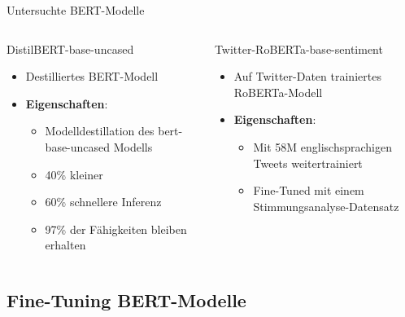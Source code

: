 \documentclass[aspectratio=169]{beamer} %
\begin{document}
\begin{frame}{Untersuchte BERT-Modelle}
\begin{columns}[T]
    \begin{block}{DistilBERT-base-uncased}
    \begin{itemize}
    \item Destilliertes BERT-Modell
    \item \textbf{Eigenschaften}:
      \begin{itemize}
      \item Modelldestillation des bert-base-uncased Modells
      \item 40\% kleiner
      \item 60\% schnellere Inferenz
      \item 97\% der Fähigkeiten bleiben erhalten
      \end{itemize}
    \end{itemize}
    \vspace{0.04cm}
    \end{block}
    \begin{block}{Twitter-RoBERTa-base-sentiment}
        \begin{itemize}
        \item Auf Twitter-Daten trainiertes RoBERTa-Modell
        \item \textbf{Eigenschaften}:
          \begin{itemize}
          \item Mit 58M englischsprachigen Tweets weitertrainiert
          \item Fine-Tuned mit einem Stimmungsanalyse-Datensatz
          \end{itemize}
        \end{itemize}
        \vfill
    \end{block}
\end{columns}
\end{frame}


\subsection{Fine-Tuning BERT-Modelle}
\end{document}
